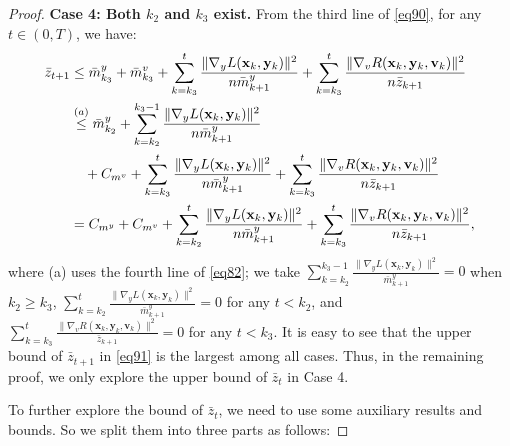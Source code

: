 \documentclass{article}
\theoremstyle{plain}
\theoremstyle{definition}
\theoremstyle{remark}
\begin{document}
\begin{proof}
\textbf{Case 4: Both $k_2$ and $k_3$ exist.}  
From the third line of \cref{eq90}, for any $t \in (0, T)$, we have:
\begin{align}
\bar{z}_{t+1} 
&\leq \bar{m}^y_{k_3} + \bar{m}^v_{k_3} + \sum_{k=k_3}^t  \frac{\|\nabla_y L(\mathbf{x}_k, \mathbf{y}_k)\|^2}{n\bar{m}^y_{k+1}} + \sum_{k=k_3}^t \frac{\|\nabla_v R(\mathbf{x}_k, \mathbf{y}_k, \mathbf{v}_k)\|^2}{n\bar{z}_{k+1}} \notag \\
&\overset{(a)}{\leq} \bar{m}^y_{k_2}  + \sum_{k=k_2}^{k_3-1} \frac{\|\nabla_y L(\mathbf{x}_k, \mathbf{y}_k)\|^2}{n\bar{m}^y_{k+1}}\nonumber\\
&\quad+ C_{m^v} + \sum_{k=k_3}^t \frac{\|\nabla_y L(\mathbf{x}_k, \mathbf{y}_k)\|^2}{n\bar{m}^y_{k+1}} + \sum_{k=k_3}^t\frac{\|\nabla_v R(\mathbf{x}_k, \mathbf{y}_k, \mathbf{v}_k)\|^2}{n\bar{z}_{k+1}} \notag \\
&= C_{m^y} + C_{m^v} + \sum_{k=k_2}^t \frac{\|\nabla_y L(\mathbf{x}_k, \mathbf{y}_k)\|^2}{n\bar{m}^y_{k+1}} + \sum_{k=k_3}^t \frac{\|\nabla_v R(\mathbf{x}_k, \mathbf{y}_k, \mathbf{v}_k)\|^2}{n\bar{z}_{k+1}},\label{eq91}
\end{align}
where (a) uses the fourth line of \cref{eq82}; we take $\sum_{k=k_2}^{k_3-1} \frac{\|\nabla_y L(\mathbf{x}_k, \mathbf{y}_k)\|^2}{\bar{m}^y_{k+1}} = 0$ when $k_2 \geq k_3$, $\sum_{k=k_2}^t \frac{\|\nabla_y L(\mathbf{x}_k, \mathbf{y}_k)\|^2}{\bar{m}^y_{k+1}} = 0$ for any $t < k_2$, and $\sum_{k=k_3}^t \frac{\|\nabla_v R(\mathbf{x}_k, \mathbf{y}_k, \mathbf{v}_k)\|^2}{\bar{z}_{k+1}} = 0$ for any $t < k_3$. 
It is easy to see that the upper bound of $\bar{z}_{t+1}$ in \cref{eq91} is the largest among all cases. Thus, in the remaining proof, we only explore the upper bound of $\bar{z}_t$ in Case 4.

To further explore the bound of $\bar{z}_t$, we need to use some auxiliary results and bounds. So we split them into three parts as follows:


\end{proof}
\end{document}
